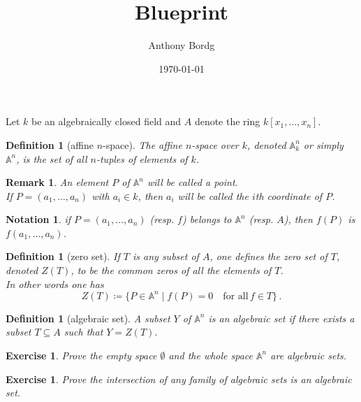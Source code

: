 \documentclass[12pt]{report}
\newtheorem{definition}[proposition]{Definition}
\newtheorem{remark}[proposition]{Remark}
\newtheorem{ex}[proposition]{Exercise}
\newtheorem{notation}{Notation}
\begin{document}
	
\title{Blueprint}
\author{Anthony Bordg}
\date{\today}
\maketitle


Let $k$ be an algebraically closed field and $A$ denote the ring $k \left[ x_1, \dots, x_n \right]$. \\

\begin{definition}[affine $n$-space] 
	The affine $n$-space over $k$, denoted $\mathbb{A}^n_k$ or simply $\mathbb{A}^n$, is the set of all $n$-tuples of elements of $k$.  
\end{definition}

\begin{remark}
	An element $P$ of $\mathbb{A}^n$ will be called a point. \\
	If $P = (a_1, \dots, a_n)$ with $a_i \in k$, then $a_i$ will be called the $i$th coordinate of $P$.
\end{remark}

\begin{notation}
	if $P = (a_1, \dots, a_n)$ (\textit{resp.} $f$) belongs to $\mathbb{A}^n$ (\textit{resp.} $A$), then $f(P)$ is $f(a_1, \dots, a_n)$.
\end{notation}		

\begin{definition}[zero set]
	If $T$ is any subset of $A$, one defines the zero set of $T$, denoted $Z(T)$, to be the common zeros of all the elements of $T$. \\
	In other words one has
	\[
	Z(T) \coloneqq \lbrace P \in \mathbb{A}^n \mid f(P) = 0 \quad \text{for all}\, f \in T \rbrace \, . 
	\]
\end{definition}

\begin{definition}[algebraic set]
	A subset $Y$ of $\mathbb{A}^n$ is an algebraic set if there exists a subset $T \subseteq A$ such that $Y = Z(T)$. 
\end{definition}

\begin{ex}
	Prove the empty space $\emptyset$ and the whole space $\mathbb{A}^n$ are algebraic sets.
\end{ex}

\begin{ex}
	Prove the intersection of any family of algebraic sets is an algebraic set.
\end{ex}
\end{document}
